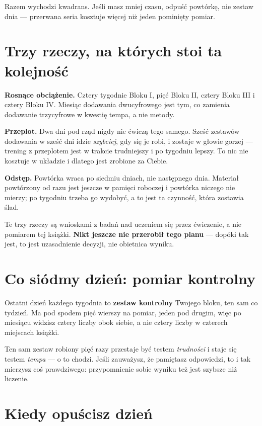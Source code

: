 \noindent
Razem wychodzi kwadrans. Jeśli masz mniej czasu, odpuść powtórkę, nie zestaw
dnia — przerwana seria kosztuje więcej niż jeden pominięty pomiar.

\section*{Trzy rzeczy, na których stoi ta kolejność}

\textbf{Rosnące obciążenie.} Cztery tygodnie Bloku I, pięć Bloku II, cztery
Bloku III i cztery Bloku IV. Miesiąc dodawania dwucyfrowego jest tym, co zamienia dodawanie
trzycyfrowe w kwestię tempa, a nie metody.

\textbf{Przeplot.} Dwa dni pod rząd nigdy nie ćwiczą tego samego. Sześć
zestawów dodawania w sześć dni idzie \emph{szybciej}, gdy się je robi, i zostaje
w głowie gorzej — trening z przeplotem jest w trakcie trudniejszy i po tygodniu
lepszy. To nic nie kosztuje w układzie i dlatego jest zrobione za Ciebie.

\textbf{Odstęp.} Powtórka wraca po siedmiu dniach, nie następnego dnia.
Materiał powtórzony od razu jest jeszcze w pamięci roboczej i powtórka niczego
nie mierzy; po tygodniu trzeba go wydobyć, a to jest ta czynność, która
zostawia ślad.

\noindent
Te trzy rzeczy są wnioskami z badań nad uczeniem się przez ćwiczenie, a nie
pomiarem tej książki. \textbf{Nikt jeszcze nie przerobił tego planu} — dopóki
tak jest, to jest uzasadnienie decyzji, nie obietnica wyniku.

\section*{Co siódmy dzień: pomiar kontrolny}

Ostatni dzień każdego tygodnia to \textbf{zestaw kontrolny} Twojego bloku, ten
sam co tydzień. Ma pod spodem pięć wierszy na pomiar, jeden pod drugim, więc po
miesiącu widzisz cztery liczby obok siebie, a nie cztery liczby w czterech
miejscach książki.

Ten sam zestaw robiony pięć razy przestaje być testem \emph{trudności} i staje
się testem \emph{tempa} — o to chodzi. Jeśli zauważysz, że pamiętasz
odpowiedzi, to i tak mierzysz coś prawdziwego: przypomnienie sobie wyniku też
jest szybsze niż liczenie.

\section*{Kiedy opuścisz dzień}


